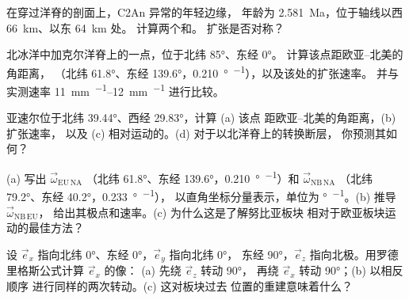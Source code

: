 \begin{exercise}[$\star$]\label{exo:b1:plate-kinematics:4}
在穿过洋脊的剖面上，C2An 异常的年轻边缘，
年龄为 \qty{2.581}{Ma}，位于轴线以西 \qty{66}{km}、以东 \qty{64}{km} 处。
计算两个和。
扩张是否对称？
\end{exercise}

\begin{exercise}[$\star\star$]\label{exo:b1:plate-kinematics:5}
北冰洋中加克尔洋脊上的一点，位于北纬 \ang{85}、东经 \ang{0}。
计算该点距欧亚–北美的角距离，
（北纬 \ang{61.8}、东经 \ang{139.6}，\qty{0.210}{\degree\per\Ma}），以及该处的扩张速率。
并与实测速率 \qtyrange{11}{12}{mm.^{-1}} 进行比较。
\end{exercise}

\begin{exercise}[$\star\star$]\label{exo:b1:plate-kinematics:6}
亚速尔位于北纬 \ang{39.44}、西经 \ang{29.83}，计算 (a) 该点
距欧亚–北美的角距离，(b) 扩张速率，
以及 (c) 相对运动的。(d) 对于以北洋脊上的转换断层，
你预测其如何？
\end{exercise}

\begin{exercise}[$\star\star$]\label{exo:b1:plate-kinematics:7}
(a) 写出 $\vec\omega_{\mathrm{EU\,NA}}$
（北纬 \ang{61.8}、东经 \ang{139.6}，\qty{0.210}{\degree\per\Ma}）和 $\vec\omega_{\mathrm{NB\,NA}}$
（北纬 \ang{79.2}、东经 \ang{40.2}，\qty{0.233}{\degree\per\Ma}），
以直角坐标分量表示，单位为 \unit{\degree\per\Ma}。(b) 推导 $\vec\omega_{\mathrm{NB\,EU}}$，
给出其极点和速率。(c) 为什么这是了解努比亚板块
相对于欧亚板块运动的最佳方法？
\end{exercise}

\begin{exercise}[$\star\star$]\label{exo:b1:plate-kinematics:8}
设 $\vec e_x$ 指向北纬 \ang{0}、东经 \ang{0}，$\vec e_y$ 指向北纬 \ang{0}，
东经 \ang{90}，$\vec e_z$ 指向北极。用罗德里格斯公式计算 $\vec e_x$ 的像：
(a) 先绕 $\vec e_z$ 转动 \ang{90}，
再绕 $\vec e_x$ 转动 \ang{90}；(b) 以相反顺序
进行同样的两次转动。(c) 这对板块过去
位置的重建意味着什么？
\end{exercise}

